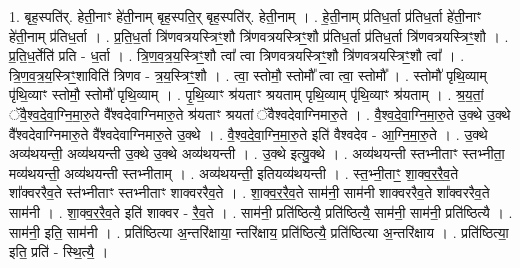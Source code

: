 \documentclass[17pt]{extarticle}
\begin{document}
1. बृह॒स्पति॑र्. हेती॒नाꣳ हे॑ती॒नाम् बृह॒स्पति॒र् बृह॒स्पति॑र्. हेती॒नाम् । . हे॒ती॒नाम् प्र॑तिध॒र्ता प्र॑तिध॒र्ता हे॑ती॒नाꣳ हे॑ती॒नाम् प्र॑तिध॒र्ता । . प्र॒ति॒ध॒र्ता त्रि॑णवत्रयस्त्रिꣳ॒॒शौ त्रि॑णवत्रयस्त्रिꣳ॒॒शौ प्र॑तिध॒र्ता प्र॑तिध॒र्ता त्रि॑णवत्रयस्त्रिꣳ॒॒शौ । . प्र॒ति॒ध॒र्तेति॑ प्रति - ध॒र्ता । . त्रि॒ण॒व॒त्र॒य॒स्त्रिꣳ॒॒शौ त्वा᳚ त्वा त्रिणवत्रयस्त्रिꣳ॒॒शौ त्रि॑णवत्रयस्त्रिꣳ॒॒शौ त्वा᳚ । . त्रि॒ण॒व॒त्र॒य॒स्त्रिꣳ॒॒शाविति॑ त्रिणव - त्र॒य॒स्त्रिꣳ॒॒शौ । . त्वा॒ स्तोमौ॒ स्तोमौ᳚ त्वा त्वा॒ स्तोमौ᳚ । . स्तोमौ॑ पृथि॒व्याम् पृ॑थि॒व्याꣳ स्तोमौ॒ स्तोमौ॑ पृथि॒व्याम् । . पृ॒थि॒व्याꣳ श्र॑यताꣳ श्रयताम् पृथि॒व्याम् पृ॑थि॒व्याꣳ श्र॑यताम् । . श्र॒य॒तां॒ ॅवै॒श्व॒दे॒वा॒ग्नि॒मा॒रु॒ते वै᳚श्वदेवाग्निमारु॒ते श्र॑यताꣳ श्रयतां ॅवैश्वदेवाग्निमारु॒ते । . वै॒श्व॒दे॒वा॒ग्नि॒मा॒रु॒ते उ॒क्थे उ॒क्थे वै᳚श्वदेवाग्निमारु॒ते वै᳚श्वदेवाग्निमारु॒ते उ॒क्थे । . वै॒श्व॒दे॒वा॒ग्नि॒मा॒रु॒ते इति॑ वैश्वदेव - आ॒ग्नि॒मा॒रु॒ते । . उ॒क्थे अव्य॑थयन्ती॒ अव्य॑थयन्ती उ॒क्थे उ॒क्थे अव्य॑थयन्ती । . उ॒क्थे इत्यु॒क्थे । . अव्य॑थयन्ती स्तभ्नीताꣳ स्तभ्नीता॒ मव्य॑थयन्ती॒ अव्य॑थयन्ती स्तभ्नीताम् । . अव्य॑थयन्ती॒ इतियव्य॑थयन्ती । . स्त॒भ्नी॒ताꣳ॒॒ शा॒क्व॒र॒रै॒व॒ते शा᳚क्वररैव॒ते स्त॑भ्नीताꣳ स्तभ्नीताꣳ शाक्वररैव॒ते । . शा॒क्व॒र॒रै॒व॒ते साम॑नी॒ साम॑नी शाक्वररैव॒ते शा᳚क्वररैव॒ते साम॑नी । . शा॒क्व॒र॒रै॒व॒ते इति॑ शाक्वर - रै॒व॒ते । . साम॑नी॒ प्रति॑ष्ठित्यै॒ प्रति॑ष्ठित्यै॒ साम॑नी॒ साम॑नी॒ प्रति॑ष्ठित्यै । . साम॑नी॒ इति॒ साम॑नी । . प्रति॑ष्ठित्या अ॒न्तरि॑क्षाया॒ न्तरि॑क्षाय॒ प्रति॑ष्ठित्यै॒ प्रति॑ष्ठित्या अ॒न्तरि॑क्षाय । . प्रति॑ष्ठित्या॒ इति॒ प्रति॑ - स्थि॒त्यै॒ । \newline
\end{document}
